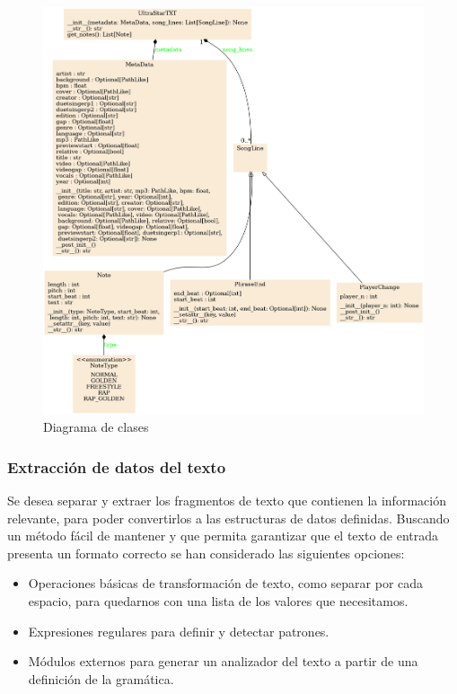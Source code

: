 \begin{figure}[H]
	\includegraphics[width=\linewidth]{logos/classes.png}
	\caption{Diagrama de clases}
	\label{fig:class1}
\end{figure}

\subsubsection{Extracción de datos del texto}

Se desea separar y extraer los fragmentos de texto que contienen la información relevante, para poder convertirlos a las estructuras de datos definidas. Buscando un método fácil de mantener y que permita garantizar que el texto de entrada presenta un formato correcto se han considerado las siguientes opciones:

\begin{itemize}
	\item{Operaciones básicas de transformación de texto, como separar por cada espacio, para quedarnos con una lista de los valores que necesitamos.}
	\item{Expresiones regulares para definir y detectar patrones.}
	\item{Módulos externos para generar un analizador del texto a partir de una definición de la gramática.}
\end{itemize}


